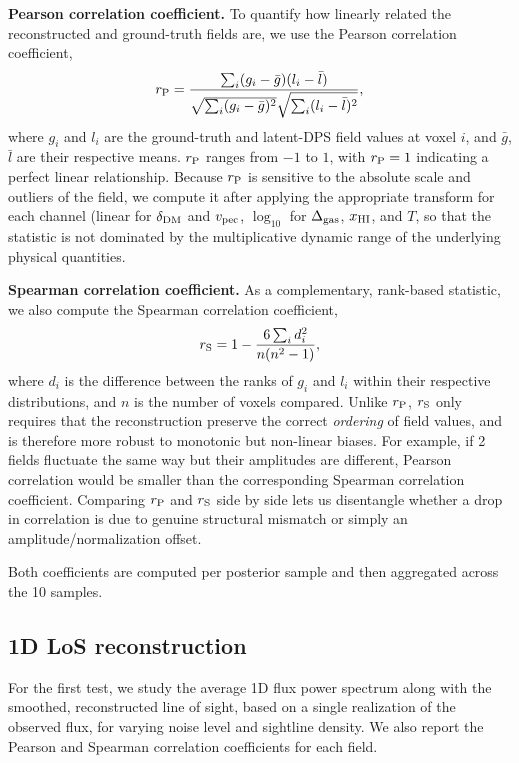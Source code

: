 \textbf{Pearson correlation coefficient.} To quantify how linearly related the reconstructed and ground-truth fields are, we use the Pearson correlation coefficient,
\begin{equation}
r_{\rm P} = \frac{\sum_i (g_i - \bar{g})(l_i - \bar{l})}{\sqrt{\sum_i (g_i - \bar{g})^2}\sqrt{\sum_i (l_i - \bar{l})^2}},
\label{eq:pearson}
\end{equation}
where $g_i$ and $l_i$ are the ground-truth and latent-DPS field values at voxel $i$, and $\bar{g}$, $\bar{l}$ are their respective means. $r_{\rm P}$ ranges from $-1$ to $1$, with $r_{\rm P}=1$ indicating a perfect linear relationship. Because $r_{\rm P}$ is sensitive to the absolute scale and outliers of the field, we compute it after applying the appropriate transform for each channel (linear for $\delta_{\rm DM}$ and $v_{\rm pec}$, $\log_{10}$ for $\Delta_{\rm gas}$, $x_{\rm HI}$, and $T$, so that the statistic is not dominated by the multiplicative dynamic range of the underlying physical quantities.

\textbf{Spearman correlation coefficient.} As a complementary, rank-based statistic, we also compute the Spearman correlation coefficient,
\begin{equation}
r_{\rm S} = 1 - \frac{6\sum_i d_i^2}{n(n^2-1)},
\label{eq:spearman}
\end{equation}
where $d_i$ is the difference between the ranks of $g_i$ and $l_i$ within their respective distributions, and $n$ is the number of voxels compared. Unlike $r_{\rm P}$, $r_{\rm S}$ only requires that the reconstruction preserve the correct \emph{ordering} of field values, and is therefore more robust to monotonic but non-linear biases. For example, if 2 fields fluctuate the same way but their amplitudes are different, Pearson correlation would be smaller than the corresponding Spearman correlation coefficient. Comparing $r_{\rm P}$ and $r_{\rm S}$ side by side lets us disentangle whether a drop in correlation is due to genuine structural mismatch or simply an amplitude/normalization offset.

Both coefficients are computed per posterior sample and then aggregated across the 10 samples.

\subsection{1D LoS reconstruction}
\label{sec:dps_1dlos}
For the first test, we study the average 1D flux power spectrum along with the smoothed, reconstructed line of sight, based on a single realization of the observed flux, for varying noise level and sightline density. We also report the Pearson and Spearman correlation coefficients for each field.


